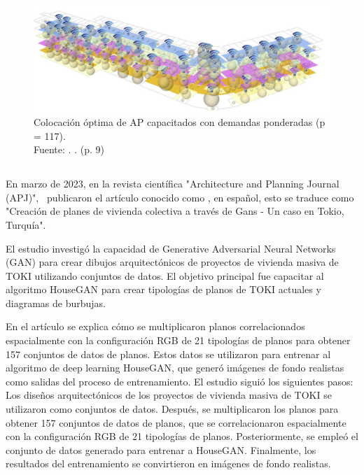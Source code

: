 \begin{figure}[!ht]
	\begin{center}
		\includegraphics[width=1\textwidth]{2/figures/lee2015.png}
		\caption[Colocación óptima de AP capacitados con demandas ponderadas (p = 117)]{Colocación óptima de AP capacitados con demandas ponderadas (p = 117).\\
		Fuente: \cite{pr_lee2015coverage3d}. . (p. 9)}
		\label{2:fig119}
	\end{center}
\end{figure}

\subsection{}
En marzo de 2023, en la revista científica "Architecture and Planning Journal (APJ)", \cite{pr_ozerol2023genermass} publicaron el artículo conocido como , en español, esto se traduce como "Creación de planes de vivienda colectiva a través de Gans - Un caso en Tokio, Turquía".

El estudio investigó la capacidad de Generative Adversarial Neural Networks (GAN) para crear dibujos arquitectónicos de proyectos de vivienda masiva de TOKI utilizando conjuntos de datos. El objetivo principal fue capacitar al algoritmo HouseGAN para crear tipologías de planos de TOKI actuales y diagramas de burbujas.

En el artículo se explica cómo se multiplicaron planos correlacionados espacialmente con la configuración RGB de 21 tipologías de planos para obtener 157 conjuntos de datos de planos. Estos datos se utilizaron para entrenar al algoritmo de deep learning HouseGAN, que generó imágenes de fondo realistas como salidas del proceso de entrenamiento. El estudio siguió los siguientes pasos: Los diseños arquitectónicos de los proyectos de vivienda masiva de TOKI se utilizaron como conjuntos de datos. Después, se multiplicaron los planos para obtener 157 conjuntos de datos de planos, que se correlacionaron espacialmente con la configuración RGB de 21 tipologías de planos. Posteriormente, se empleó el conjunto de datos generado para entrenar a HouseGAN. Finalmente, los resultados del entrenamiento se convirtieron en imágenes de fondo realistas.

